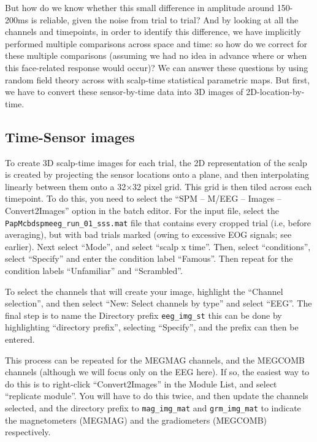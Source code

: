But how do we know whether this small difference in amplitude around 150-200ms is reliable, given the noise from trial to trial? And by looking at all the channels and timepoints, in order to identify this difference, we have implicitly performed multiple comparisons across space and time: so how do we correct for these multiple comparisons (assuming we had no idea in advance where or when this face-related response would occur)? We can answer these questions by using random field theory across with scalp-time statistical parametric maps. But first, we have to convert these sensor-by-time data into 3D images of 2D-location-by-time.

\subsection{Time-Sensor images}

To create 3D scalp-time images for each trial, the 2D representation of the scalp is created by projecting the sensor locations onto a plane, and then interpolating linearly between them onto a 32\(\times\)32 pixel grid. This grid is then tiled across each timepoint. To do this, you need to select the ``SPM -- M/EEG -- Images -- Convert2Images'' option in the batch editor. For the input file, select the \texttt{PapMcbdspmeeg\_run\_01\_sss.mat} file that contains every cropped trial (i.e, before averaging), but with bad trials marked (owing to excessive EOG signals; see earlier). Next select ``Mode'', and select ``scalp x time''. Then, select ``conditions'', select ``Specify'' and enter the condition label ``Famous''. Then repeat for the condition labels ``Unfamiliar'' and ``Scrambled''. 

To select the channels that will create your image, highlight the ``Channel selection'', and then select ``New: Select channels by type'' and select ``EEG''. The final step is to name the Directory prefix \texttt{eeg\_img\_st} this can be done by highlighting ``directory prefix'', selecting ``Specify'', and the prefix can then be entered.

This process can be repeated for the MEGMAG channels, and the MEGCOMB channels (although we will focus only on the EEG here). If so, the easiest way to do this is to right-click ``Convert2Images'' in the Module List, and select ``replicate module''. You will have to do this twice, and then update the channels selected, and the directory prefix to \texttt{mag\_img\_mat} and \texttt{grm\_img\_mat} to indicate the magnetometers (MEGMAG) and the gradiometers (MEGCOMB) respectively. 

